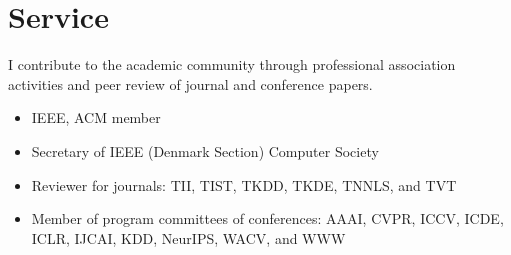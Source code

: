 \label{sec:service}
\section*{Service}

I contribute to the academic community through professional association activities and peer review of journal and conference papers.
\vspace{\entryskip}
\begin{itemize}
    \item IEEE, ACM member
    \item Secretary of IEEE (Denmark Section) Computer Society
    \item Reviewer for journals: TII, TIST, TKDD, TKDE, TNNLS, and TVT
    \item Member of program committees of conferences: AAAI, CVPR, ICCV, ICDE, ICLR, IJCAI, KDD, NeurIPS, WACV, and WWW
\end{itemize}

